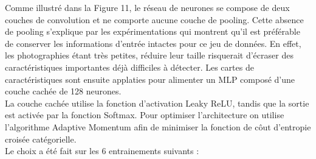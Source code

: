 \begin{multicols}{2}
Comme illustré dans la Figure 11, le réseau de neurones se compose de deux couches de 
convolution et ne comporte aucune couche de pooling. Cette absence de pooling
s’explique par les expérimentations qui montrent qu’il est préférable de conserver 
les informations d’entrée intactes pour ce jeu de données. En effet, les photographies 
étant très petites, réduire leur taille risquerait d'écraser des caractéristiques importantes déjà 
difficiles à détecter. Les cartes de caractéristiques sont ensuite applaties pour alimenter
un MLP composé d'une couche cachée de 128 neurones. \\

La couche cachée utilise la fonction d’activation Leaky ReLU, 
tandis que la sortie est activée par la fonction Softmax. Pour optimiser l'architecture
on utilise l'algorithme Adaptive Momentum afin de minimiser la fonction de côut 
d'entropie croisée catégorielle. \\

Le choix a été fait sur les 6 entrainements suivants : \\

 \\


\end{multicols}
